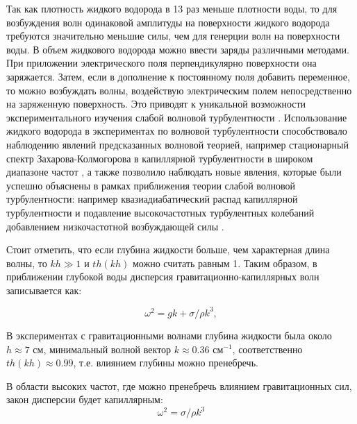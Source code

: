 Так как плотность жидкого водорода в 13 раз меньше плотности воды, то для возбуждения волн одинаковой амплитуды на поверхности жидкого водорода требуются значительно меньшие силы, чем для генерции волн на поверхности воды. В объем жидкового водорода можно ввести заряды различными методами. При приложении электрического поля перпендикулярно поверхности она заряжается. Затем, если в дополнение к постоянному поля добавить переменное, то можно возбуждать волны, воздействую электрическим полем непосредственно на заряженную поверхность. Это  приводят к уникальной возможности экспериментального изучения слабой волновой турбулентности \cite{Kolmakov2006}. Использование жидкого водорода в экспериментах по волновой турбулентности способствовало наблюдению явлений предсказанных волновой теорией, например стационарный спектр Захарова-Колмогорова в капиллярной турбулентности в широком диапазоне частот \cite{Brazhnikov2001}, а также позволило наблюдать новые явления, которые были успешно объяснены в рамках приближения теории слабой волновой турбулентности: например квазиадиабатический распад капиллярной турбулентности \cite{quasiadiabatic} и подавление высокочастотных турбулентных колебаний добавлением низкочастотной возбуждающей силы \cite{addLowFreq}.

Стоит отметить, что если глубина жидкости больше, чем характерная длина волны, то $kh\gg 1$ и $th(kh)$ можно считать равным 1. Таким образом, в приближении глубокой воды дисперсия гравитационно-капиллярных волн записывается как:


\begin{equation}
 \label{eq:disper}
\omega^2 = gk + \sigma/\rho k^3,
\end{equation}


В экспериментах с гравитационными волнами глубина жидкости была около $ h \approx 7$ см, минимальный волной вектор $k \approx 0.36$ см$^{-1}$, соответственно $th(kh) \approx 0.99$, т.е. влиянием глубины можно пренебречь.


В области высоких частот, где можно пренебречь влиянием гравитационных сил, закон дисперсии будет капиллярным:
\begin{equation}
 \label{eq:disperCap}
\omega^2 = \sigma/\rho k^3
\end{equation}


